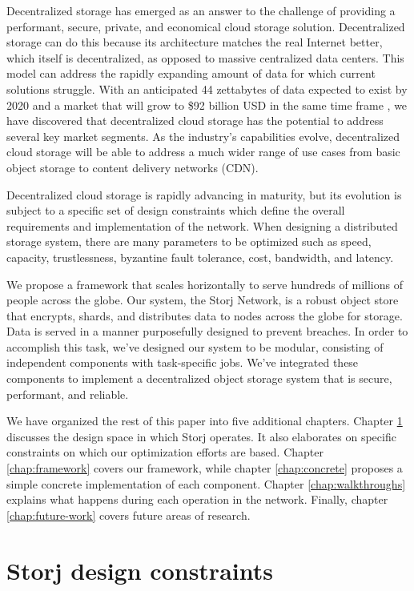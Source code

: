 \documentclass[11pt,fleqn,openany]{book}
\begin{document}
Decentralized storage has emerged as an answer to the challenge of
providing a performant, secure, private, and economical cloud storage solution.
Decentralized storage can do this because its architecture matches the real
Internet better, which itself is decentralized, as opposed to massive
centralized data centers. This model can address the rapidly
expanding amount of data for which current solutions struggle.
With an anticipated 44 zettabytes of data expected to exist by 2020 and a
market that will grow to \$92 billion USD in the same time frame
\cite{storage-growth}, we have discovered that decentralized cloud storage
has the potential to address several key market segments.
As the industry's capabilities evolve, decentralized cloud
storage will be able to address a much wider range of use cases from basic
object storage to content delivery networks (CDN).

Decentralized cloud storage is rapidly advancing in maturity, but its evolution
is subject to a specific set of design constraints which
define the overall requirements and implementation of
the network. When designing a distributed storage system,
there are many parameters to be optimized such as speed, capacity,
trustlessness, byzantine fault tolerance, cost, bandwidth, and latency.

We propose a framework that scales horizontally to serve hundreds of millions of
people across the globe. Our system, the Storj Network, is a robust object store
that encrypts, shards, and distributes data to nodes across the globe for
storage.
Data is served in a manner purposefully designed to prevent
breaches.
In order to accomplish this task, we've designed our system to be modular,
consisting of independent components with task-specific jobs.
We've integrated these components to implement a decentralized object storage
system that is secure, performant, and reliable.

We have organized the rest of this paper into five additional
chapters. Chapter \ref{chap:design-constraints} discusses the design space
in which Storj operates. It also elaborates on specific constraints on which
our optimization efforts are based.
Chapter \ref{chap:framework} covers our framework, while chapter
\ref{chap:concrete}
proposes a simple concrete implementation of each component.
Chapter \ref{chap:walkthroughs} explains what happens
during each operation in the network. Finally, chapter
\ref{chap:future-work} covers future areas of research.

\chapter{Storj design constraints}\label{chap:design-constraints}
\end{document}
